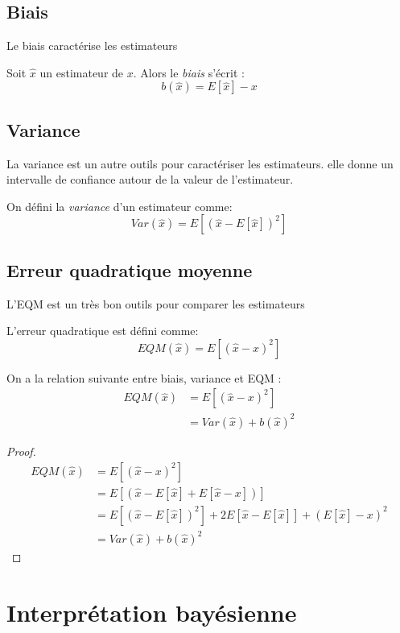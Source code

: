 \documentclass[main.tex]{subfiles}
\begin{document}
\subsection{Biais}
Le biais caractérise les estimateurs
\begin{defin}
  Soit $\hat{x}$ un estimateur de $x$. Alors le \emph{biais} s'écrit :
  \[
    b(\hat{x}) = E[\hat{x}]-x
  \]
\end{defin}

\subsection{Variance}
La variance est un autre outils pour caractériser les
estimateurs. elle donne un intervalle de confiance autour de la valeur
de l'estimateur.
\begin{defin}
  On défini la \emph{variance} d'un estimateur comme:
  \[
    Var(\hat{x}) = E[(\hat{x}-E[\hat{x}])^2]
  \]
\end{defin}

\subsection{Erreur quadratique moyenne}
L'EQM est un très bon outils pour comparer les estimateurs
\begin{defin}
  L'erreur quadratique est défini comme:
  \[
    EQM(\hat{x}) = E[(\hat{x}-x)^2]
  \]
\end{defin}
\begin{prop}
  On a la relation suivante entre biais, variance et EQM :
  \begin{align*}
    EQM(\hat{x}) &= E[(\hat{x}-x)^2] \\
                 &= Var(\hat{x}) + b(\hat{x})^2
  \end{align*}
\end{prop}
\begin{proof}
\begin{align*}
    EQM(\hat{x}) &= E[(\hat{x}-x)^2] \\
                 &= E[(\hat{x}-E[\hat{x}]+E[\hat{x}-x])] \\
                 &= E[(\hat{x}-E[\hat{x}])^2]+2E[\hat{x}-E[\hat{x}]]+(E[\hat{x}]-x)^2\\
                 &= Var(\hat{x}) + b(\hat{x})^2
  \end{align*}
\end{proof}
\section{Interprétation bayésienne}
\end{document}
